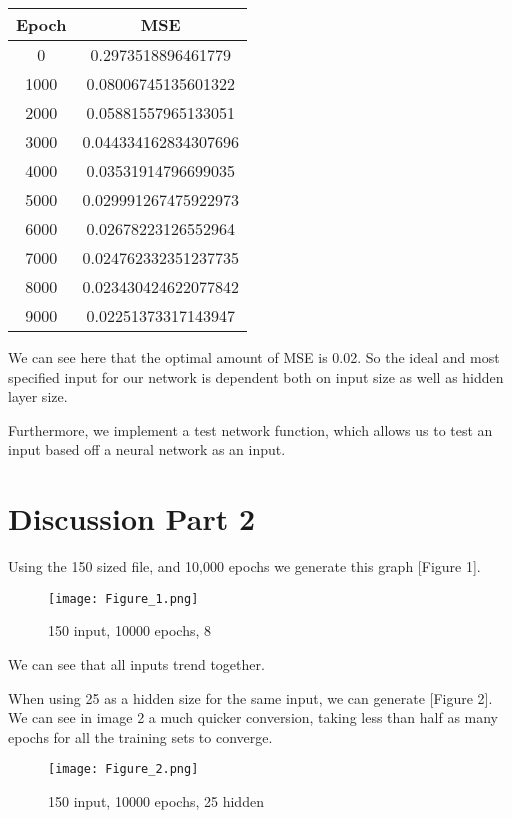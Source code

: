 \documentclass[12pt]{article}
\begin{document}
\begin{table}[h]
\centering
\begin{tabular}{|c|c|}
\hline
Epoch & MSE \\
\hline
0 & 0.2973518896461779 \\
1000 & 0.08006745135601322 \\
2000 & 0.05881557965133051 \\
3000 & 0.044334162834307696 \\
4000 & 0.03531914796699035 \\
5000 & 0.029991267475922973 \\
6000 & 0.02678223126552964 \\
7000 & 0.024762332351237735 \\
8000 & 0.023430424622077842 \\
9000 & 0.02251373317143947 \\
\hline
\end{tabular}
\end{table}

We can see here that the optimal amount of MSE is 0.02. So the ideal and most specified input for our network is dependent both on input size as well as hidden layer size.

Furthermore, we implement a  test network function, which allows us to test an input based off a neural network as an input. 

\section{Discussion Part 2}
Using the 150 sized file, and 10,000 epochs we generate this graph [Figure 1].

\begin{figure}[p]
  \centering
  \texttt{[image: Figure\_1.png]}
  \caption{150 input, 10000 epochs, 8}
  \label{fig:my_label}
\end{figure}

We can see that all inputs trend together.

When using 25 as a hidden size for the same input, we can generate [Figure 2]. We can see in image 2 a much quicker conversion, taking less than half as many epochs for all the training sets to converge. 

\begin{figure}[h]
  \centering
  \texttt{[image: Figure\_2.png]}
  \caption{150 input, 10000 epochs, 25 hidden}
  \label{fig:my_label}
\end{figure}
\end{document}
